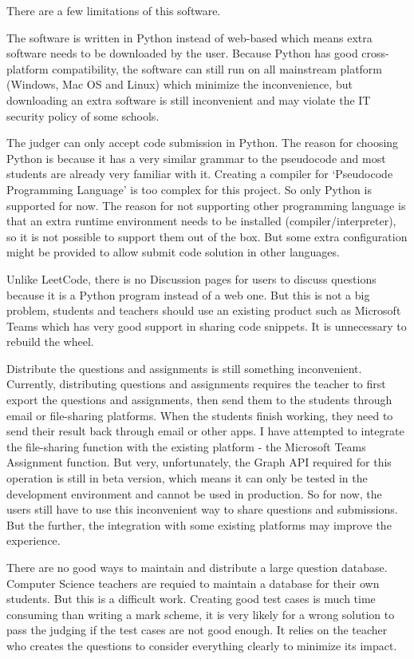 \documentclass[a4paper]{report}
\begin{document}
There are a few limitations of this software.

The software is written in Python instead of web-based which means extra software needs to be downloaded by the user. Because Python has good cross-platform compatibility, the software can still run on all mainstream platform (Windows, Mac OS and Linux) which minimize the inconvenience, but downloading an extra software is still inconvenient and may violate the IT security policy of some schools.

The judger can only accept code submission in Python. The reason for choosing Python is because it has a very similar grammar to the pseudocode and most students are already very familiar with it. Creating a compiler for `Pseudocode Programming Language' is too complex for this project. So only Python is supported for now. The reason for not supporting other programming language is that an extra runtime environment needs to be installed (compiler/interpreter), so it is not possible to support them out of the box. But some extra configuration might be provided to allow submit code solution in other languages.

Unlike LeetCode, there is no Discussion pages for users to discuss questions because it is a Python program instead of a web one. But this is not a big problem, students and teachers should use an existing product such as Microsoft Teams which has very good support in sharing code snippets. It is unnecessary to rebuild the wheel.

Distribute the questions and assignments is still something inconvenient. Currently, distributing questions and assignments requires the teacher to first export the questions and assignments, then send them to the students through email or file-sharing platforms. When the students finish working, they need to send their result back through email or other apps. I have attempted to integrate the file-sharing function with the existing platform - the Microsoft Teams Assignment function. But very, unfortunately, the Graph API required for this operation is still in beta version, which means it can only be tested in the development environment and cannot be used in production. So for now, the users still have to use this inconvenient way to share questions and submissions. But the further, the integration with some existing platforms may improve the experience.

There are no good ways to maintain and distribute a large question database. Computer Science teachers are requied to maintain a database for their own students. But this is a difficult work. Creating good test cases is much time consuming than writing a mark scheme, it is very likely for a wrong solution to pass the judging if the test cases are not good enough. It relies on the teacher who creates the questions to consider everything clearly to minimize its impact.
\end{document}
